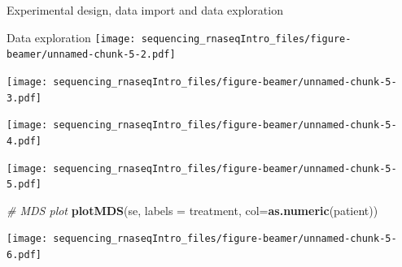 \documentclass[ignorenonframetext,]{beamer}
\newenvironment{Shaded}{\begin{snugshade}}{\end{snugshade}}
\newcommand{\CommentTok}[1]{\textcolor[rgb]{0.56,0.35,0.01}{\textit{#1}}}
\newcommand{\DataTypeTok}[1]{\textcolor[rgb]{0.13,0.29,0.53}{#1}}
\newcommand{\FloatTok}[1]{\textcolor[rgb]{0.00,0.00,0.81}{#1}}
\newcommand{\KeywordTok}[1]{\textcolor[rgb]{0.13,0.29,0.53}{\textbf{#1}}}
\newcommand{\NormalTok}[1]{#1}
\newcommand{\OperatorTok}[1]{\textcolor[rgb]{0.81,0.36,0.00}{\textbf{#1}}}
\newcommand{\StringTok}[1]{\textcolor[rgb]{0.31,0.60,0.02}{#1}}
\begin{document}
\begin{frame}[fragile]{Experimental design, data import and data
exploration}
\begin{block}{Data exploration}
\texttt{[image: sequencing\_rnaseqIntro\_files/figure-beamer/unnamed-chunk-5-2.pdf]}

\begin{Shaded}
\end{Shaded}

\texttt{[image: sequencing\_rnaseqIntro\_files/figure-beamer/unnamed-chunk-5-3.pdf]}

\begin{Shaded}
\end{Shaded}

\texttt{[image: sequencing\_rnaseqIntro\_files/figure-beamer/unnamed-chunk-5-4.pdf]}

\begin{Shaded}
\end{Shaded}

\texttt{[image: sequencing\_rnaseqIntro\_files/figure-beamer/unnamed-chunk-5-5.pdf]}

\begin{Shaded}
\begin{Highlighting}[]
\CommentTok{# MDS plot}
\KeywordTok{plotMDS}\NormalTok{(se, }
        \DataTypeTok{labels =}\NormalTok{ treatment, }
        \DataTypeTok{col=}\KeywordTok{as.numeric}\NormalTok{(patient))}
\end{Highlighting}
\end{Shaded}

\texttt{[image: sequencing\_rnaseqIntro\_files/figure-beamer/unnamed-chunk-5-6.pdf]}


\end{block}
\end{frame}
\end{document}
